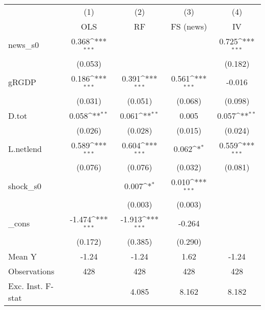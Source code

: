 {
\def\sym#1{\ifmmode^{#1}\else\(^{#1}\)\fi}
\begin{tabular}{l*{4}{c}}
\toprule
            &\multicolumn{1}{c}{(1)}&\multicolumn{1}{c}{(2)}&\multicolumn{1}{c}{(3)}&\multicolumn{1}{c}{(4)}\\
            &\multicolumn{1}{c}{OLS}&\multicolumn{1}{c}{RF}&\multicolumn{1}{c}{FS (news)}&\multicolumn{1}{c}{IV}\\
\midrule
news\_s0     &       0.368\sym{***}&                     &                     &       0.725\sym{***}\\
            &     (0.053)         &                     &                     &     (0.182)         \\
\addlinespace
gRGDP       &       0.186\sym{***}&       0.391\sym{***}&       0.561\sym{***}&      -0.016         \\
            &     (0.031)         &     (0.051)         &     (0.068)         &     (0.098)         \\
\addlinespace
D.tot       &       0.058\sym{**} &       0.061\sym{**} &       0.005         &       0.057\sym{**} \\
            &     (0.026)         &     (0.028)         &     (0.015)         &     (0.024)         \\
\addlinespace
L.netlend   &       0.589\sym{***}&       0.604\sym{***}&       0.062\sym{*}  &       0.559\sym{***}\\
            &     (0.076)         &     (0.076)         &     (0.032)         &     (0.081)         \\
\addlinespace
shock\_s0    &                     &       0.007\sym{*}  &       0.010\sym{***}&                     \\
            &                     &     (0.003)         &     (0.003)         &                     \\
\addlinespace
\_cons      &      -1.474\sym{***}&      -1.913\sym{***}&      -0.264         &                     \\
            &     (0.172)         &     (0.385)         &     (0.290)         &                     \\
\midrule
Mean Y      &       -1.24         &       -1.24         &        1.62         &       -1.24         \\
Observations&         428         &         428         &         428         &         428         \\
Exc. Inst. F-stat&                     &       4.085         &       8.162         &       8.182         \\
\bottomrule
\end{tabular}
}

